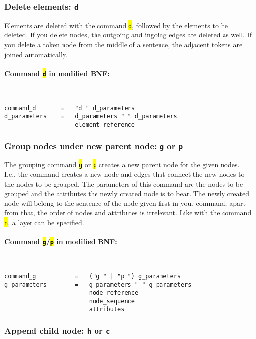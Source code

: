 \documentclass[12pt]{scrartcl}
\newcommand{\code}[1]{\hl{\texttt{#1}}}
\begin{document}
\subsubsection{Delete elements: \texttt{d}}

Elements are deleted with the command \code{d}, followed by the elements to be deleted.
If you delete nodes, the outgoing and ingoing edges are deleted as well.
If you delete a token node from the middle of a sentence, the adjacent tokens are joined automatically.

\paragraph*{Command \code{d} in modified BNF:}
~
\begin{lstlisting}
command_d       =   "d " d_parameters
d_parameters    =   d_parameters " " d_parameters
                    element_reference
\end{lstlisting}


\subsubsection{Group nodes under new parent node: \texttt{g} or \texttt{p}}

The grouping command \code{g} or \code{p} creates a new parent node for the given nodes.
I.e., the command creates a new node and edges that connect the new nodes to the nodes to be grouped.
The parameters of this command are the nodes to be grouped and the attributes the newly created node is to bear.
The newly created node will belong to the sentence of the node given first in your command; apart from that, the order of nodes and attributes is irrelevant.
Like with the command \code{n}, a layer can be specified.

\paragraph*{Command \code{g}/\code{p} in modified BNF:}
~
\begin{lstlisting}
command_g           =   ("g " | "p ") g_parameters
g_parameters        =   g_parameters " " g_parameters
                        node_reference
                        node_sequence
                        attributes
\end{lstlisting}


\subsubsection{Append child node: \texttt{h} or \texttt{c}}
\end{document}
